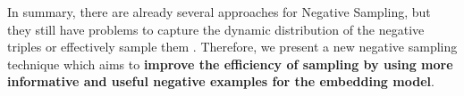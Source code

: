 In summary, there are already several approaches for Negative Sampling, but they still have problems to capture the dynamic distribution of the negative triples or effectively sample them \cite{zhang2021efficient}.
Therefore, we present a new negative sampling technique which aims to \textbf{improve the efficiency of sampling by using more informative and useful negative examples for the embedding model}.


